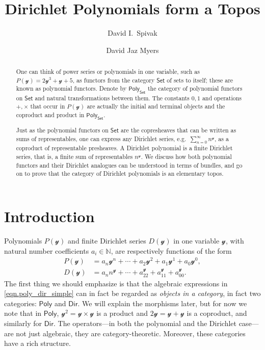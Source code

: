 \documentclass[11pt, article, one side]{memoir}
\theoremstyle{theorem}
\theoremstyle{definition}
\theoremstyle{remark}
\newcommand{\cat}[1]{\mathcal{#1}}%
\newcommand{\Cat}[1]{\mathsf{#1}}%
\newcommand{\nn}{\mathbb{N}}
\newcommand{\smset}{\Cat{Set}}
\newcommand{\yon}{\mathcal{y}}
\newcommand{\poly}{\Cat{Poly}}
\newcommand{\dir}{\Cat{Dir}}
\begin{document}
\title{Dirichlet Polynomials form a Topos}

\author{David I.\ Spivak%
\and David Jaz Myers%
}

\maketitle
\begin{abstract}
One can think of power series or polynomials in one variable, such as $P(\yon)=2\yon^3+\yon+5$, as functors from the category $\smset$ of sets to itself; these are known as polynomial functors. Denote by $\poly_\smset$ the category of polynomial functors on $\smset$ and natural transformations between them. The constants $0,1$ and operations $+,\times$ that occur in $P(\yon)$ are actually the initial and terminal objects and the coproduct and product in $\poly_\smset$. 

Just as the polynomial functors on $\smset$ are the copresheaves that can be written as sums of representables, one can express any Dirichlet series, e.g.\ $\sum_{n=0}^\infty n^\yon$, as a coproduct of representable presheaves. A Dirichlet polynomial is a finite Dirichlet series, that is, a finite sum of representables $n^{\yon}$. We discuss how both polynomial functors and their Dirichlet analogues can be understood in terms of bundles, and go on to prove that the category of Dirichlet polynomials is an elementary topos.

\end{abstract}

\chapter{Introduction}\label{chap.intro}

Polynomials $P(\yon)$ and finite Dirichlet series $D(\yon)$ in one variable $\cat{y}$, with natural number coefficients $a_i\in\nn$, are respectively functions of the form
\begin{equation}\label{eqn.poly_dir_simple}
\begin{aligned}
  P(\yon)&=a_n\yon^n+\cdots+a_2\yon^2+a_1\yon^1+a_0\yon^0,\\
  D(\yon)&=a_n n^\yon+\cdots+a_22^\yon+a_11^\yon+a_00^\yon.
\end{aligned}
\end{equation}
The first thing we should emphasize is that the algebraic expressions in \eqref{eqn.poly_dir_simple} can in fact be regarded as \emph{objects in a category}, in fact two categories: $\poly$ and $\dir$. We will explain the morphisms later, but for now we note that in $\poly$, $\yon^2=\yon\times\yon$ is a product and $2\yon=\yon+\yon$ is a coproduct, and similarly for $\dir$. The operators---in both the polynomial and the Dirichlet case---are not just algebraic, they are category-theoretic. Moreover, these categories have a rich structure. 
\end{document}
